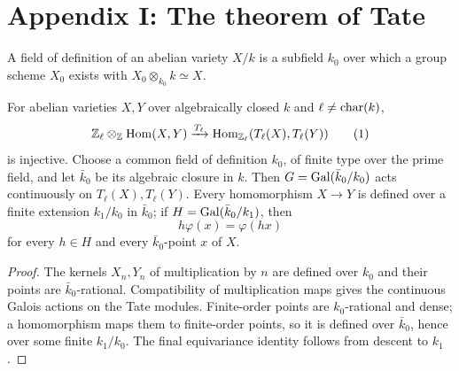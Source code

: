 
\section{Appendix I: The theorem of Tate}
\label{mumford-appendix-I-intro-source}

\begin{definition}
\label{mumford-def-field-of-definition}
A field of definition of an abelian variety $X/k$ is a subfield $k_0$ over
which a group scheme $X_0$ exists with $X_0\otimes_{k_0}k\simeq X$.
\end{definition}

\begin{proposition}
\label{mumford-prop-tate-module-field-definition}
For abelian varieties $X,Y$ over algebraically closed $k$ and
$\ell\ne{\rm char}(k)$,
\[
\mathbb Z_\ell\otimes_{\mathbb Z}{\rm Hom}(X,Y)\xrightarrow{T_\ell}
{\rm Hom}_{\mathbb Z_\ell}(T_\ell(X),T_\ell(Y)) \tag{1}
\]
is injective. Choose a common field of definition $k_0$, of finite type over
the prime field, and let $\bar k_0$ be its algebraic closure in $k$. Then
$G={\rm Gal}(\bar k_0/k_0)$ acts continuously on $T_\ell(X),T_\ell(Y)$.
Every homomorphism $X\to Y$ is defined over a finite extension $k_1/k_0$ in
$\bar k_0$; if $H={\rm Gal}(\bar k_0/k_1)$, then
\[
 h\varphi(x)=\varphi(hx)
\]
for every $h\in H$ and every $\bar k_0$-point $x$ of $X$.
\end{proposition}
\begin{proof}
The kernels $X_n,Y_n$ of multiplication by $n$ are defined over $k_0$ and
their points are $\bar k_0$-rational. Compatibility of multiplication maps
gives the continuous Galois actions on the Tate modules. Finite-order points
are $k_0$-rational and dense; a homomorphism maps them to finite-order points,
so it is defined over $\bar k_0$, hence over some finite $k_1/k_0$. The final
equivariance identity follows from descent to $k_1$.

\end{proof}
